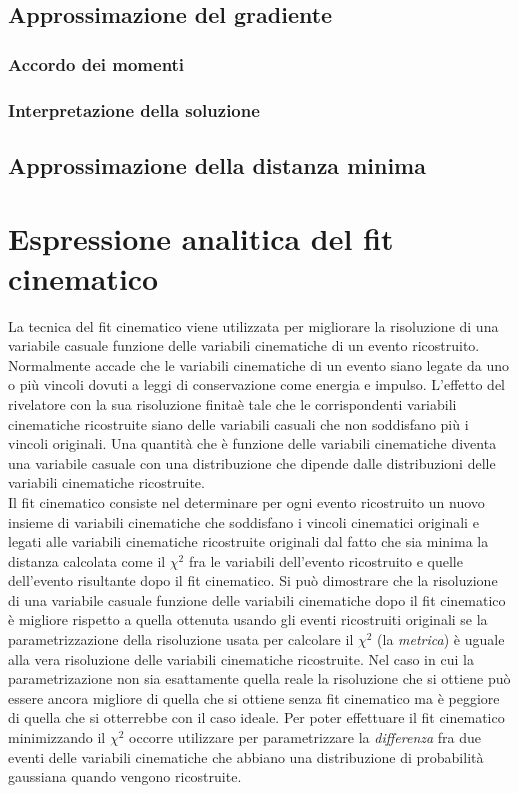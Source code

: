 \subsection{Approssimazione del gradiente}
\subsubsection{Accordo dei momenti}
\subsubsection{Interpretazione della soluzione}
\subsection{Approssimazione della distanza minima}
%
\section{Espressione analitica del fit cinematico}
La tecnica del fit cinematico viene utilizzata per migliorare la risoluzione
di una variabile casuale  funzione delle variabili cinematiche di un evento
ricostruito. Normalmente accade che le variabili cinematiche di un evento
siano legate da uno o pi\`u vincoli dovuti a leggi di conservazione come energia e impulso. L'effetto del rivelatore con la sua risoluzione finita\`e tale che le corrispondenti variabili cinematiche ricostruite siano delle
variabili casuali che non soddisfano pi\`u i vincoli originali. Una quantit\`a
che \`e funzione delle variabili cinematiche diventa una variabile casuale con una distribuzione che dipende dalle distribuzioni delle variabili cinematiche
ricostruite.\\
Il fit cinematico consiste nel determinare per ogni evento ricostruito un nuovo
insieme di variabili cinematiche che soddisfano i vincoli cinematici originali e legati alle variabili cinematiche ricostruite originali dal fatto che sia minima
la distanza calcolata come il $\chi^2$ fra le variabili dell'evento ricostruito e
quelle dell'evento risultante dopo il fit cinematico. Si pu\`o dimostrare che la risoluzione di una variabile casuale funzione delle variabili cinematiche dopo
il fit cinematico \`e migliore rispetto a quella ottenuta usando gli eventi ricostruiti originali se la parametrizzazione della risoluzione usata per calcolare
il $\chi^2$ (la {\em metrica}) \`e uguale alla vera risoluzione delle variabili
cinematiche ricostruite. Nel caso in cui la parametrizazione non sia esattamente quella reale la risoluzione che si ottiene pu\`o essere ancora migliore di quella
che si ottiene senza fit cinematico ma \`e peggiore di quella che si otterrebbe con
il caso ideale. Per poter effettuare il fit cinematico minimizzando il $\chi^2$ occorre utilizzare per parametrizzare la {\em differenza} fra due eventi delle variabili cinematiche che abbiano una distribuzione di probabilit\`a gaussiana quando vengono ricostruite.
